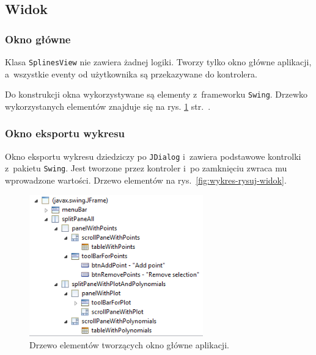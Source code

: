 \documentclass[10pt,a4paper]{article}
\newcommand{\f}[1]{\texttt{#1}}
\begin{document}
\subsection{Widok}

\subsubsection{Okno główne}

Klasa \f{SplinesView} nie zawiera żadnej logiki. Tworzy tylko okno główne
aplikacji, a~wszystkie eventy od użytkownika są przekazywane do kontrolera.

Do konstrukcji okna wykorzystywane są elementy z~frameworku \f{Swing}. Drzewko
wykorzystanych elementów znajduje się na rys. \ref{fig:aplikacja-widok}
str.~\pageref{fig:aplikacja-widok}.

\subsubsection{Okno eksportu wykresu}

Okno eksportu wykresu dziedziczy po \f{JDialog} i~zawiera podstawowe kontrolki
z~pakietu \f{Swing}. Jest tworzone przez kontroler i~po zamknięciu zwraca mu
wprowadzone wartości. Drzewo elementów na rys.~\ref{fig:wykres-rysuj-widok}. 

\begin{figure}[p]
  \centering
  \includegraphics[width=0.67\textwidth]{figury/aplikacja-widok}
  \caption{Drzewo elementów tworzących okno główne aplikacji.}
  \label{fig:aplikacja-widok}
\end{figure}
\end{document}
